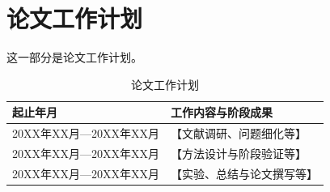 \section{论文工作计划}
这一部分是论文工作计划。
\begin{table}[htbp]
	\centering
	\caption{论文工作计划}
	\label{tab:plan}
	
	\begin{tabularx}{0.96\textwidth}{
			>{\centering\arraybackslash}p{}
			>{\centering\arraybackslash}X
		}
		\toprule
		起止年月 & 工作内容与阶段成果\\
		\midrule
		20XX年XX月—20XX年XX月 & 【文献调研、问题细化等】\\
		20XX年XX月—20XX年XX月 & 【方法设计与阶段验证等】\\
		20XX年XX月—20XX年XX月 & 【实验、总结与论文撰写等】\\
		\bottomrule
	\end{tabularx}
\end{table}